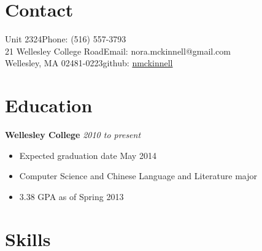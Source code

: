 \documentclass[margin,line]{resume}
\begin{document}
\begin{resume}

    \section{\mysidestyle Contact}

    Unit 2324\hfill Phone: (516) 557-3793          \vspace{0mm}\\\vspace{0mm}%
    21 Wellesley College Road\hfill Email: nora.mckinnell@gmail.com  \vspace{0mm}\\\vspace{-4.5mm}%
    Wellesley, MA 02481-0223\hfill github: \href{https://github.com/nmckinnell}{nmckinnell}  \vspace{0mm}\\\vspace{1mm}%
    \section{\mysidestyle Education}

    \textbf{Wellesley College} \hfill \textsl{2010 to present}\vspace{0mm}\\\vspace{-2mm}%
    \begin{itemize}
	\item Expected graduation date May 2014
	\item Computer Science and Chinese Language and Literature major
	\item 3.38 GPA as of Spring 2013\vspace{-2mm}\\%
    \end{itemize}
    \section{\mysidestyle Skills} 


\end{resume}
\end{document}
